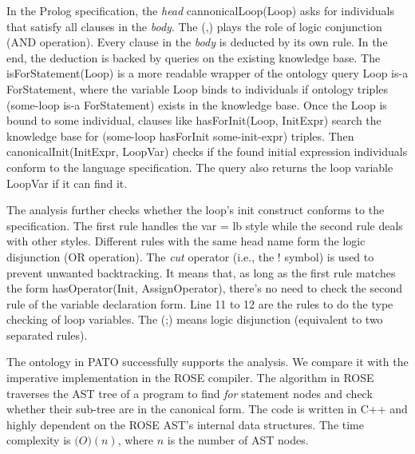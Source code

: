 In the Prolog specification, the \emph{head}
\textsf{cannonicalLoop(Loop)} asks for individuals that satisfy all
clauses in the \emph{body}.  The (\textsf{,}) plays the role of logic
conjunction (AND operation).  Every clause in the \emph{body} is
deducted by its own rule.  In the end, the deduction is backed by
queries on the existing knowledge base.  The
\textsf{isForStatement(Loop)} is a more readable wrapper of the
ontology query \textsf{Loop is-a ForStatement}, where the variable
\textsf{Loop} binds to individuals if ontology triples
\textsf{(some-loop is-a ForStatement)} exists in the knowledge base.
Once the Loop is bound to some individual, clauses like
\textsf{hasForInit(Loop, InitExpr)} search the knowledge base for
\textsf{(some-loop hasForInit some-init-expr)} triples.  Then
\textsf{canonicalInit(InitExpr, LoopVar)} checks if the found
initial expression individuals conform to the language specification.
The query also returns the loop variable \textsf{LoopVar} if it can
find it.

The analysis further checks whether the loop's init construct conforms
to the specification.
The first rule handles the \textsf{var = lb} style while the second
rule deals with other styles.  Different rules with the same head name
form the logic disjunction (OR operation).  The \emph{cut} operator
(i.e., the ! symbol) is used to prevent unwanted backtracking.  It
means that, as long as the first rule matches the form
\textsf{hasOperator(Init, AssignOperator)}, there's no need to check
the second rule of the variable declaration form.
Line 11 to 12 are the rules to do the type checking of loop variables.
The \textsf{(;)} means logic disjunction (equivalent to two separated rules).

\vspace*{.1in} 


The ontology in PATO successfully supports the analysis.  We compare
it with the imperative implementation in the ROSE compiler. The
algorithm in ROSE traverses the AST tree of a program to find {\em for}
statement nodes and check whether their sub-tree are in the canonical form.
The code is written in C++ and highly dependent on the ROSE AST's
internal data structures.  The time complexity is $\mathcal(O)(n)$,
where $n$ is the number of AST nodes.  

